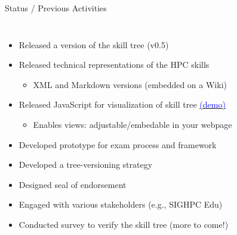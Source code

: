 \documentclass[compress,aspectratio=169]{beamer}
\newcommand{\hrefb}[2]{\href{#1}{\textcolor{blue}{#2}}}
\begin{document}
\begin{frame}{Status / Previous Activities}

\begin{columns}
	\begin{itemize}
	\item Released a version of the skill tree (v0.5)
	\item Released technical representations of the HPC skills
    \begin{itemize}
      \item XML and Markdown versions (embedded on a Wiki)
    \end{itemize}
	\item Released JavaScript for visualization of skill tree \hrefb{https://www.hpc-certification.org/skills/}{(demo)}
		\begin{itemize}
			\item Enables views: adjustable/embedable in your webpage
		\end{itemize}
	\item Developed prototype for exam process and framework
  \item Developed a tree-versioning strategy
	\item Designed seal of endorsement
	\item Engaged with various stakeholders (e.g., SIGHPC Edu)
	\item Conducted survey to verify the skill tree (more to come!)
\end{itemize}


\end{columns}
\end{frame}
\end{document}

